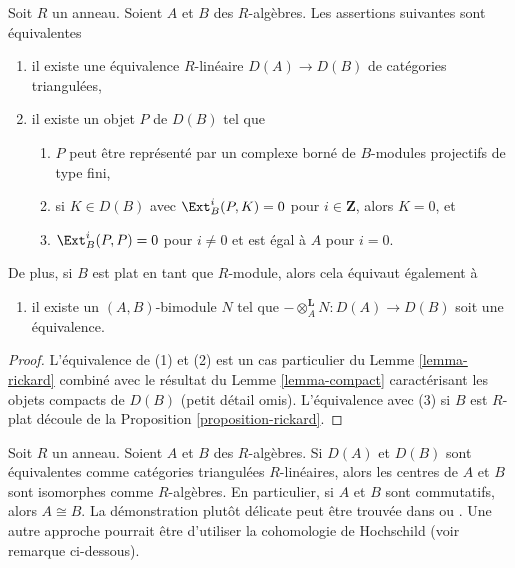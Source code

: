 \begin{lemma}
\label{lemma-rickard-rings}
Soit $R$ un anneau. Soient $A$ et $B$ des $R$-algèbres. Les assertions suivantes
sont équivalentes
\begin{enumerate}
\item il existe une équivalence $R$-linéaire $D(A) \to D(B)$ de catégories
triangulées,
\item il existe un objet $P$ de $D(B)$ tel que
\begin{enumerate}
\item $P$ peut être représenté par un complexe borné de $B$-modules projectifs
de type fini,
\item si $K \in D(B)$ avec $\Ext^i_B(P, K) = 0$ pour $i \in \mathbf{Z}$, alors $K
= 0$, et
\item $\Ext^i_B(P, P) = 0$ pour $i \not = 0$ et est égal à $A$ pour $i= 0$.
\end{enumerate}
\end{enumerate}
De plus, si $B$ est plat en tant que $R$-module, alors cela équivaut également à
\begin{enumerate}
\item[(3)] il existe un $(A, B)$-bimodule $N$ tel que $- \otimes_A^\mathbf{L} N :
D(A) \to D(B)$ soit une équivalence.
\end{enumerate}
\end{lemma}

\begin{proof}
L'équivalence de (1) et (2) est un cas particulier du Lemme \ref{lemma-rickard}
combiné avec le résultat du Lemme \ref{lemma-compact} caractérisant les objets
compacts de $D(B)$ (petit détail omis). L'équivalence avec (3) si $B$ est $R$-plat
découle de la Proposition \ref{proposition-rickard}.
\end{proof}

\begin{remark}
\label{remark-centers}
Soit $R$ un anneau. Soient $A$ et $B$ des $R$-algèbres. Si $D(A)$ et $D(B)$ sont
équivalentes comme catégories triangulées $R$-linéaires, alors les centres de
$A$ et $B$ sont isomorphes comme $R$-algèbres. En particulier, si $A$ et $B$
sont commutatifs, alors $A \cong B$. La démonstration plutôt délicate peut être
trouvée dans \cite[Proposition 9.2]{Rickard} ou \cite[Proposition 6.3.2]{KZ}. Une
autre approche pourrait être d’utiliser la cohomologie de Hochschild (voir
remarque ci-dessous).
\end{remark}

